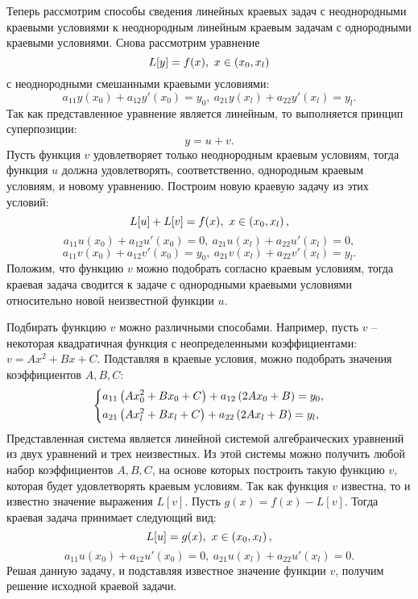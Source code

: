 	Теперь рассмотрим способы сведения линейных краевых задач с неоднородными краевыми условиями к неоднородным линейным краевым задачам с однородными краевыми условиями. Снова рассмотрим уравнение
	\[ L[y] = f(x), ~ x \in \left( x_0, x_l \right) \]
	с неоднородными смешанными краевыми условиями:
	\[ a_{11} y(x_0) + a_{12} y'(x_0) = y_0, ~ a_{21} y(x_l) + a_{22} y'(x_l) = y_l. \]
	Так как представленное уравнение является линейным, то выполняется принцип суперпозиции:
	\[ y = u + v. \]
	Пусть функция $v$ удовлетворяет только неоднородным краевым условиям, тогда функция $u$ должна удовлетворять, соответственно, однородным краевым условиям, и новому уравнению. Построим новую краевую задачу из этих условий:
	\[ L[u] + L[v] = f(x), ~ x \in \left( x_0, x_l \right), \]
	\[ a_{11} u(x_0) + a_{12} u'(x_0) = 0, ~ a_{21} u(x_l) + a_{22} u'(x_l) = 0, \]
	\[ a_{11} v(x_0) + a_{12} v'(x_0) = y_0, ~ a_{21} v(x_l) + a_{22} v'(x_l) = y_l. \]
	Положим, что функцию $v$ можно подобрать согласно краевым условиям, тогда краевая задача сводится к задаче с однородными краевыми условиями относительно новой неизвестной функции $u$.

	Подбирать функцию $v$ можно различными способами. Например, пусть $v$ -- некоторая квадратичная функция с неопределенными коэффициентами: $v = Ax^2 + Bx + C$. Подставляя в краевые условия, можно подобрать значения коэффициентов $A, B, C$:
	\[ \left\lbrace \begin{aligned} 
		&a_{11} \left( A x_0^2 + B x_0 + C \right) + a_{12} \left( 2A x_0 + B \right) = y_0, \\
		&a_{21} \left( A x_l^2 + B x_l + C \right) + a_{22} \left( 2A x_l + B \right) = y_l, \\
	 \end{aligned} \right. \] 
	Представленная система является линейной системой алгебраических уравнений из двух уравнений и трех неизвестных. Из этой системы можно получить любой набор коэффициентов $A, B, C$, на основе которых построить такую функцию $v$, которая будет удовлетворять краевым условиям. Так как функция $v$ известна, то и известно значение выражения $L[v]$. Пусть $g(x) = f(x) - L[v]$. Тогда краевая задача принимает следующий вид:
	\[ L[u] = g(x), ~ x \in \left( x_0, x_l \right), \]
	\[ a_{11} u(x_0) + a_{12} u'(x_0) = 0, ~ a_{21} u(x_l) + a_{22} u'(x_l) = 0. \]
	Решая данную задачу, и подставляя известное значение функции $v$, получим решение исходной краевой задачи.

	\vspace{10pt}

